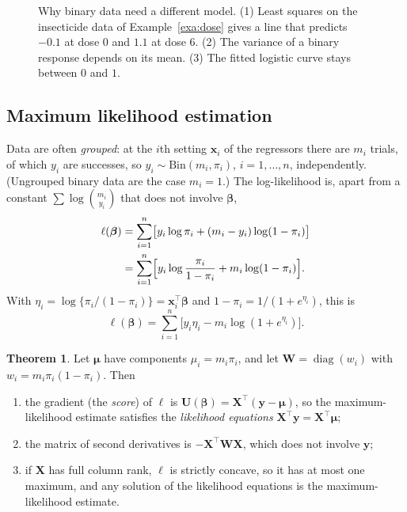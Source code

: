 \documentclass[11pt,a4paper]{article}
\numberwithin{equation}{section}
\theoremstyle{definition}
\newtheorem{thm}{Theorem}[subsection]
\begin{document}
\begin{figure}[H]
\caption{Why binary data need a different model. (1) Least squares on the insecticide data of
Example~\ref{exa:dose} gives a line that predicts $-0.1$ at dose $0$ and $1.1$ at dose $6$. (2) The variance of a binary
response depends on its mean. (3) The fitted logistic curve stays between $0$ and $1$.}
\label{fig:why-logistic}
\end{figure}

\subsection{Maximum likelihood estimation}
Data are often \emph{grouped}: at the $i$th setting $\mathbf{x}_i$ of the regressors there are $m_i$ trials, of which
$y_i$ are successes, so $y_i \sim \text{Bin}(m_i, \pi_i)$, $i = 1, \dots, n$, independently. (Ungrouped binary data are the case
$m_i = 1$.) The log-likelihood is, apart from a constant $\sum\log\binom{m_i}{y_i}$ that does not involve $\boldsymbol\beta$,
\begin{align*}
\ell(\boldsymbol\beta) &= \sum_{i=1}^n\bigl[y_i\log\pi_i + (m_i - y_i)\log(1 - \pi_i)\bigr] \\
&= \sum_{i=1}^n\Bigl[y_i\log\frac{\pi_i}{1 - \pi_i} + m_i\log(1 - \pi_i)\Bigr] .
\end{align*}
With $\eta_i = \log\{\pi_i/(1 - \pi_i)\} = \mathbf{x}_i^\top\boldsymbol\beta$ and $1 - \pi_i = 1/(1 + e^{\eta_i})$, this is
\[
\ell(\boldsymbol\beta) = \sum_{i=1}^n\bigl[y_i\eta_i - m_i\log(1 + e^{\eta_i})\bigr] .
\]

\begin{thm}\label{thm:logistic-score}
Let $\boldsymbol\mu$ have components $\mu_i = m_i\pi_i$, and let $\mathbf{W} = \operatorname{diag}(w_i)$ with $w_i = m_i\pi_i(1 - \pi_i)$. Then
\begin{enumerate}[label=(\roman*)]
\item the gradient (the \emph{score}) of $\ell$ is $\mathbf{U}(\boldsymbol\beta) = \mathbf{X}^\top(\mathbf{y} - \boldsymbol\mu)$, so the maximum-likelihood estimate
satisfies the \emph{likelihood equations} $\mathbf{X}^\top\mathbf{y} = \mathbf{X}^\top\hat{\boldsymbol\mu}$;
\item the matrix of second derivatives is $-\mathbf{X}^\top\mathbf{WX}$, which does not involve $\mathbf{y}$;
\item if $\mathbf{X}$ has full column rank, $\ell$ is strictly concave, so it has at most one maximum, and any solution
of the likelihood equations is the maximum-likelihood estimate.
\end{enumerate}
\end{thm}
\end{document}
